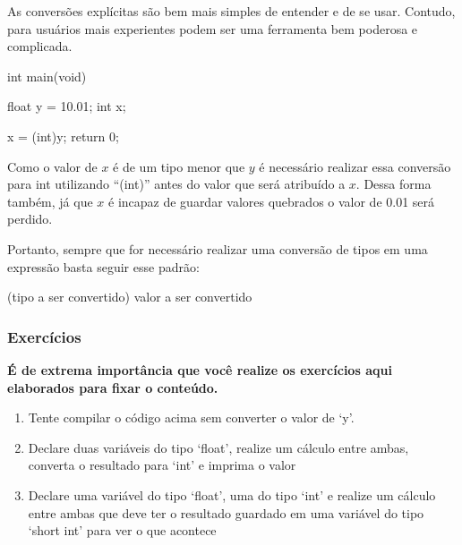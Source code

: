 As conversões explícitas são bem mais simples de entender e de se usar. 
Contudo, para usuários mais experientes podem ser uma ferramenta bem poderosa 
e complicada.

\newpage
\begin{excode}
    int main(void) {
        float y = 10.01;
        int x;

        x = (int)y;
        return 0;
    }
\end{excode}

Como o valor de \(x\) é de um tipo menor que \(y\) é necessário realizar essa 
conversão para int utilizando ``(int)'' antes do valor que será atribuído a 
\(x\). Dessa forma também, já que \(x\) é incapaz de guardar valores quebrados 
o valor de 0.01 será perdido.

Portanto, sempre que for necessário realizar uma conversão de tipos em uma 
expressão basta seguir esse padrão:

\begin{textbox}
    (tipo a ser convertido) valor a ser convertido
\end{textbox}

\subsubsection{Exercícios}

\textbf{É de extrema importância que você realize os exercícios aqui 
elaborados para fixar o conteúdo.}

\begin{enumerate}
    \item{Tente compilar o código acima sem converter o valor de `y'.}
    \item{Declare duas variáveis do tipo `float', realize um cálculo entre 
        ambas, converta o resultado para `int' e imprima o valor}
    \item{Declare uma variável do tipo `float', uma do tipo `int' e realize um cálculo entre ambas que deve ter o resultado guardado em uma variável do tipo `short int' para ver o que acontece}
\end{enumerate}
